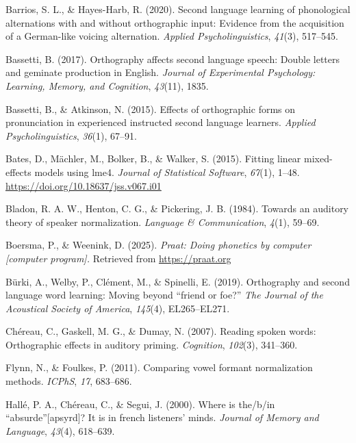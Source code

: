 \documentclass[
  english,
  man,floatsintext]{apa7}
\newlength{\cslhangindent}
\newenvironment{CSLReferences}[2] %
 {\begin{list}{}{%
  \setlength{\itemindent}{0pt}
  \setlength{\leftmargin}{0pt}
  \setlength{\parsep}{0pt}
  \ifodd #1
   \setlength{\leftmargin}{\cslhangindent}
   \setlength{\itemindent}{-1\cslhangindent}
  \fi
  \setlength{\itemsep}{#2\baselineskip}}}
 {\end{list}}
\begin{document}
\protect{}\label{refs}
\begin{CSLReferences}{1}{0}
Barrios, S. L., \& Hayes-Harb, R. (2020). Second language learning of phonological alternations with and without orthographic input: Evidence from the acquisition of a {G}erman-like voicing alternation. \emph{Applied Psycholinguistics}, \emph{41}(3), 517--545.

Bassetti, B. (2017). Orthography affects second language speech: Double letters and geminate production in {E}nglish. \emph{Journal of Experimental Psychology: Learning, Memory, and Cognition}, \emph{43}(11), 1835.

Bassetti, B., \& Atkinson, N. (2015). Effects of orthographic forms on pronunciation in experienced instructed second language learners. \emph{Applied Psycholinguistics}, \emph{36}(1), 67--91.

Bates, D., Mächler, M., Bolker, B., \& Walker, S. (2015). Fitting linear mixed-effects models using {lme4}. \emph{Journal of Statistical Software}, \emph{67}(1), 1--48. \url{https://doi.org/10.18637/jss.v067.i01}

Bladon, R. A. W., Henton, C. G., \& Pickering, J. B. (1984). Towards an auditory theory of speaker normalization. \emph{Language \& Communication}, \emph{4}(1), 59--69.

Boersma, P., \& Weenink, D. (2025). \emph{Praat: Doing phonetics by computer {[}computer program{]}.} Retrieved from \url{https://praat.org}

Bürki, A., Welby, P., Clément, M., \& Spinelli, E. (2019). Orthography and second language word learning: Moving beyond {``friend or foe?''} \emph{The Journal of the Acoustical Society of America}, \emph{145}(4), EL265--EL271.

Chéreau, C., Gaskell, M. G., \& Dumay, N. (2007). Reading spoken words: Orthographic effects in auditory priming. \emph{Cognition}, \emph{102}(3), 341--360.

Flynn, N., \& Foulkes, P. (2011). Comparing vowel formant normalization methods. \emph{ICPhS}, \emph{17}, 683--686.

Hallé, P. A., Chéreau, C., \& Segui, J. (2000). Where is the/b/in {``absurde''}{[}apsyrd{]}? It is in french listeners' minds. \emph{Journal of Memory and Language}, \emph{43}(4), 618--639.


\end{CSLReferences}
\end{document}
